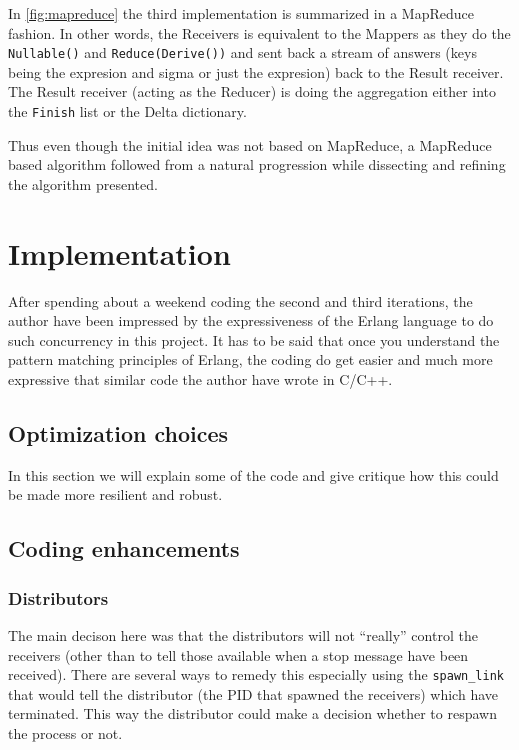\documentclass[a4paper,11pt]{report}
\begin{document}
In \ref{fig:mapreduce} the third implementation is summarized in a
MapReduce fashion. In other words, the Receivers is equivalent to the
Mappers as they do the \texttt{Nullable()} and
\texttt{Reduce(Derive())} and sent back a stream of answers (keys
being the expresion and sigma or just the expresion) back to the
Result receiver. The Result receiver (acting as the Reducer) is doing
the aggregation either into the \texttt{Finish} list or the Delta
dictionary.

Thus even though the initial idea was not based on MapReduce, a
MapReduce based algorithm followed from a natural progression while
dissecting and refining the algorithm presented.

\chapter{Implementation}

After spending about a weekend coding the second and third iterations,
the author have been impressed by the expressiveness of the Erlang
language to do such concurrency in this project. It has to be said
that once you understand the pattern matching principles of Erlang,
the coding do get easier and much more expressive that similar code
the author have wrote in C/C++.


\pagebreak

\section{Optimization choices}

In this section we will explain some of the code and give critique how
this could be made more resilient and robust.

\section{Coding enhancements}
\subsection{Distributors}
\label{sec:codedist}

The main decison here was that the distributors will not ``really''
control the receivers (other than to tell those available when a stop
message have been received). There are several ways to remedy this
especially using the \texttt{spawn\_link} that would tell the
distributor (the PID that spawned the receivers) which have
terminated. This way the distributor could make a decision whether to
respawn the process or not. 
\end{document}
